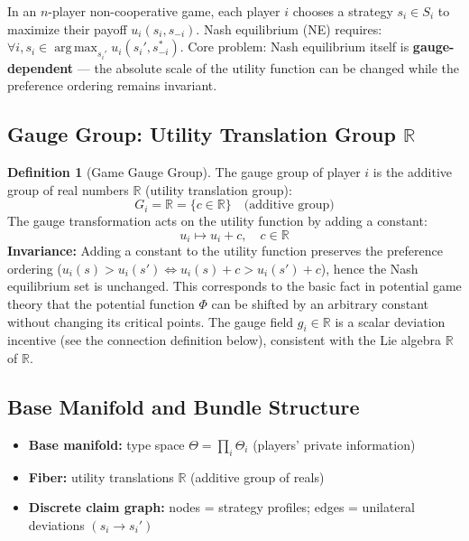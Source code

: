 \documentclass[12pt,a4paper]{article}
\theoremstyle{plain}
\theoremstyle{definition}
\newtheorem{definition}[theorem]{Definition}
\newcommand{\R}{\mathbb{R}}
\DeclareMathOperator{\argmax}{arg\,max}
\begin{document}
In an $n$-player non-cooperative game, each player $i$ chooses a strategy $s_i \in S_i$ to maximize their payoff
$u_i(s_i, s_{-i})$. Nash equilibrium (NE) requires: $\forall i, s_i \in \argmax_{s_i'} u_i(s_i', s_{-i}^*)$.
Core problem: Nash equilibrium itself is \textbf{gauge-dependent} — the absolute scale of the utility function can be changed while the preference ordering remains invariant.

\subsection{Gauge Group: Utility Translation Group $\R$}

\begin{definition}[Game Gauge Group]
The gauge group of player $i$ is the additive group of real numbers $\R$ (utility translation group):
\begin{equation}
    G_i = \R = \{c \in \R\} \quad \text{(additive group)}
\end{equation}
The gauge transformation acts on the utility function by adding a constant:
\begin{equation}
    u_i \mapsto u_i + c, \quad c \in \R
\end{equation}
\textbf{Invariance:} Adding a constant to the utility function preserves the preference ordering ($u_i(s) > u_i(s') \iff u_i(s)+c > u_i(s')+c$), hence the Nash equilibrium set is unchanged. This corresponds to the basic fact in potential game theory that the potential function $\Phi$ can be shifted by an arbitrary constant without changing its critical points. The gauge field $g_i \in \R$ is a scalar deviation incentive (see the connection definition below), consistent with the Lie algebra $\R$ of $\R$.
\end{definition}

\subsection{Base Manifold and Bundle Structure}

\begin{itemize}
    \item \textbf{Base manifold:} type space $\Theta = \prod_i \Theta_i$ (players' private information)
    \item \textbf{Fiber:} utility translations $\R$ (additive group of reals)
    \item \textbf{Discrete claim graph:} nodes = strategy profiles; edges = unilateral deviations $(s_i \to s_i')$
\end{itemize}
\end{document}
